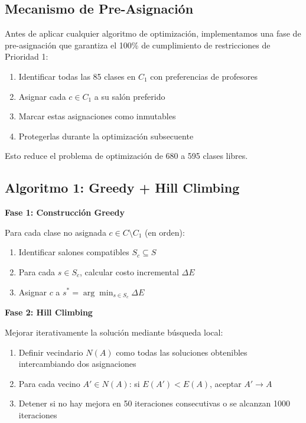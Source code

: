 \documentclass[12pt,a4paper]{article}
\begin{document}
\subsection{Mecanismo de Pre-Asignación}

Antes de aplicar cualquier algoritmo de optimización, implementamos una fase de pre-asignación que garantiza el 100\% de cumplimiento de restricciones de Prioridad 1:

\begin{enumerate}
\item Identificar todas las 85 clases en $C_1$ con preferencias de profesores
\item Asignar cada $c \in C_1$ a su salón preferido
\item Marcar estas asignaciones como inmutables
\item Protegerlas durante la optimización subsecuente
\end{enumerate}

Esto reduce el problema de optimización de 680 a 595 clases libres.

\subsection{Algoritmo 1: Greedy + Hill Climbing}

\textbf{Fase 1: Construcción Greedy}

Para cada clase no asignada $c \in C \setminus C_1$ (en orden):
\begin{enumerate}
\item Identificar salones compatibles $S_c \subseteq S$
\item Para cada $s \in S_c$, calcular costo incremental $\Delta E$
\item Asignar $c$ a $s^* = \arg\min_{s \in S_c} \Delta E$
\end{enumerate}

\textbf{Fase 2: Hill Climbing}

Mejorar iterativamente la solución mediante búsqueda local:
\begin{enumerate}
\item Definir vecindario $N(A)$ como todas las soluciones obtenibles intercambiando dos asignaciones
\item Para cada vecino $A' \in N(A)$: si $E(A') < E(A)$, aceptar $A' \rightarrow A$
\item Detener si no hay mejora en 50 iteraciones consecutivas o se alcanzan 1000 iteraciones
\end{enumerate}
\end{document}
